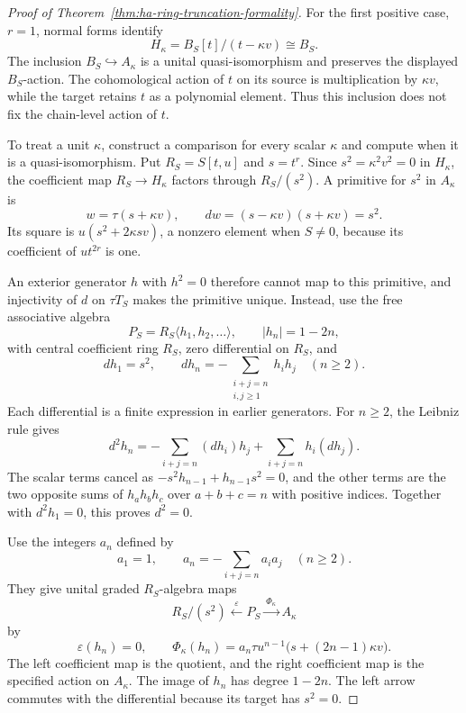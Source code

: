 \begin{proof}[Proof of Theorem~\ref{thm:ha-ring-truncation-formality}]
For the first positive case, $r=1$, normal forms identify
\[
 H_\kappa=B_S[t]/(t-\kappa v)\cong B_S.
\]
The inclusion $B_S\hookrightarrow A_\kappa$ is a unital
quasi-isomorphism and preserves the displayed $B_S$-action.
The cohomological action of $t$ on its source is multiplication by
$\kappa v$, while the target retains $t$ as a polynomial element.
Thus this inclusion does not fix the chain-level action of $t$.

To treat a unit $\kappa$, construct a comparison for every scalar
$\kappa$ and compute when it is a quasi-isomorphism.
Put $R_S=S[t,u]$ and $s=t^r$.
Since $s^2=\kappa^2v^2=0$ in $H_\kappa$, the coefficient map
$R_S\to H_\kappa$ factors through $R_S/(s^2)$.
A primitive for $s^2$ in $A_\kappa$ is
\[
 w=\tau(s+\kappa v),\qquad dw=(s-\kappa v)(s+\kappa v)=s^2.
\]
Its square is $u(s^2+2\kappa sv)$, a nonzero element when $S\ne0$,
because its coefficient of $ut^{2r}$ is one.

An exterior generator $h$ with $h^2=0$ therefore cannot map to this
primitive, and injectivity of $d$ on $\tau T_S$ makes the primitive unique.
Instead, use the free associative algebra
\[
 P_S=R_S\langle h_1,h_2,\ldots\rangle,\qquad |h_n|=1-2n,
\]
with central coefficient ring $R_S$, zero differential on $R_S$, and
\[
 dh_1=s^2,\qquad
 dh_n=-\sum_{\substack{i+j=n\\i,j\geq1}}h_ih_j\quad(n\geq2).
\]
Each differential is a finite expression in earlier generators.
For $n\geq2$, the Leibniz rule gives
\[
 d^2h_n=-\sum_{i+j=n}(dh_i)h_j+\sum_{i+j=n}h_i(dh_j).
\]
The scalar terms cancel as $-s^2h_{n-1}+h_{n-1}s^2=0$,
and the other terms are the two opposite sums of $h_ah_bh_c$ over
$a+b+c=n$ with positive indices.
Together with $d^2h_1=0$, this proves $d^2=0$.

Use the integers $a_n$ defined by
\[
 a_1=1,\qquad a_n=-\sum_{i+j=n}a_ia_j\quad(n\geq2).
\]
They give unital graded $R_S$-algebra maps
\[
 R_S/(s^2)\xleftarrow{\ \varepsilon\ }P_S
 \xrightarrow{\ \Phi_\kappa\ }A_\kappa
\]
by
\[
 \varepsilon(h_n)=0,\qquad
 \Phi_\kappa(h_n)=a_n\tau u^{n-1}\bigl(s+(2n-1)\kappa v\bigr).
\]
The left coefficient map is the quotient, and the right coefficient
map is the specified action on $A_\kappa$.
The image of $h_n$ has degree $1-2n$.
The left arrow commutes with the differential because its target
has $s^2=0$.


\end{proof}
